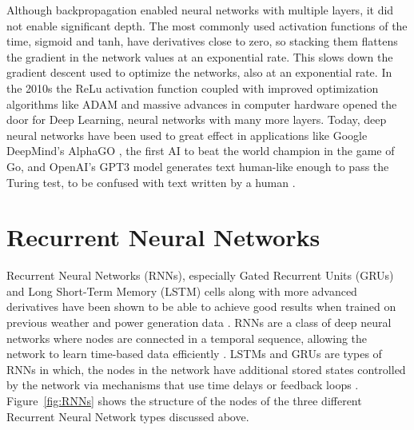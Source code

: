 Although backpropagation enabled neural networks with multiple layers, it did not enable significant depth. The most commonly used activation functions of the time, sigmoid and tanh, have derivatives close to zero, so stacking them flattens the gradient in the network values at an exponential rate. This slows down the gradient descent used to optimize the networks, also at an exponential rate. In the 2010s the ReLu activation function \cite{nair_rectified_2010} coupled with improved optimization algorithms like ADAM \cite{kingma_adam_2014} and massive advances in computer hardware opened the door for Deep Learning, neural networks with many more layers. Today, deep neural networks have been used to great effect in applications like Google DeepMind's AlphaGO \cite{silver_mastering_2016}, the first AI to beat the world champion in the game of Go, and OpenAI's GPT3 model generates text human-like enough to pass the Turing test, to be confused with text written by a human \cite{vandeput_brief_nodate}.


\section{Recurrent Neural Networks\label{cha:RNN}}
Recurrent Neural Networks (RNNs), especially Gated Recurrent Units (GRUs) \cite{cho_properties_2014} and Long Short-Term Memory (LSTM) cells \cite{hochreiter_long_1997, goodfellow_deep_2016} along with more advanced derivatives have been shown to be able to achieve good results when trained on previous weather and power generation data \cite{lin_temporal_2020, lee_forecasting_2018, jaidee_very_2019, su_machine_2019}.
RNNs are a class of deep neural networks where nodes are connected in a temporal sequence, allowing the network to learn time-based data efficiently \cite{lim_time_2021}. LSTMs and GRUs are types of RNNs in which, the nodes in the network have additional stored states controlled by the network via mechanisms that use time delays or feedback loops \cite{goodfellow_deep_2016, noauthor_recurrent_2021}. Figure~\ref{fig:RNNs} shows the structure of the nodes of the three different Recurrent Neural Network types discussed above.

